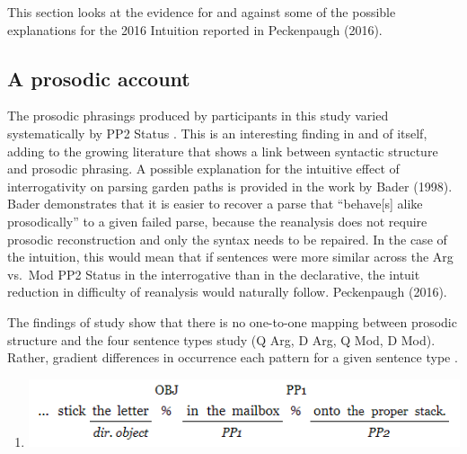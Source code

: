 \documentclass[12pt,oneside]{book}
\providecommand{\tightlist}{%
  \setlength{\itemsep}{0pt}\setlength{\parskip}{0pt}}
\begin{document}
This section looks at the evidence for and against some of the possible explanations for the 2016 Intuition reported in Peckenpaugh (2016). 

\hypertarget{prep}{%
\subsection{A prosodic account}\label{prep}}

The prosodic phrasings produced by participants in this study varied systematically by PP2 Status . This is an interesting finding in and of itself, adding to the growing literature that shows a link between syntactic structure and prosodic phrasing. A possible explanation for the intuitive effect of interrogativity on parsing garden paths is provided in the work by Bader (1998). Bader demonstrates that it is easier to recover  a  parse that ``behave{[}s{]} alike prosodically'' to a given failed parse, because the reanalysis does not require prosodic reconstruction and only the syntax needs to be repaired. In the case of the  intuition, this would mean that if sentences were more  similar across the Arg vs.~Mod PP2 Status in the interrogative than in the declarative, the intuit reduction in difficulty of reanalysis would naturally follow.  Peckenpaugh (2016).

The findings of  study show that there is no one-to-one mapping between prosodic structure and the four sentence types  study (Q Arg, D Arg, Q Mod, D Mod). Rather,   gradient differences in occurrence  each pattern for a given sentence type . 

\begin{enumerate}
\def\labelenumi{(\arabic{enumi})}
\setcounter{enumi}{62}
\tightlist
\item
  \includegraphics{breakpos.png}
\end{enumerate}
\end{document}
